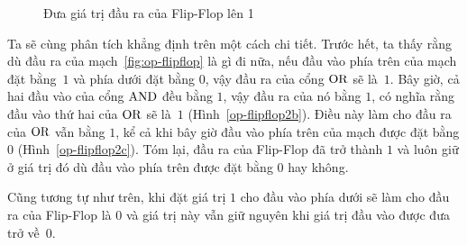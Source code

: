 \begin{figure}[tbh]
{\label{op-flipflop2b}
} \qquad {}
\caption{Đưa giá trị đầu ra của Flip-Flop lên 1}
\label{fig:op-flipflop2}
\end{figure}

Ta sẽ cùng phân tích khẳng định trên một cách chi tiết. Trước hết, ta thấy rằng dù đầu ra
của mạch~\ref{fig:op-flipflop} là gì đi nữa, nếu đầu vào phía trên của mạch đặt
bằng~$1$ và phía dưới đặt bằng $0$, vậy đầu ra của cổng $\operatorname{\mbox{OR}}$ sẽ là~$1$. Bây giờ, cả hai
đầu vào của cổng $\operatorname{\mbox{AND}}$ đều bằng $1$, vậy đầu ra của nó bằng $1$, có nghĩa rằng đầu vào
thứ hai của $\operatorname{\mbox{OR}}$ sẽ là~$1$ (Hình~\ref{op-flipflop2b}). Điều này làm cho đầu ra của $\operatorname{\mbox{OR}}$
vẫn bằng $1$, kể cả khi bây giờ đầu vào phía trên của mạch được đặt bằng $0$ (Hình~\ref{op-flipflop2c}).  Tóm lại, đầu ra của Flip-Flop đã trở thành $1$ và luôn giữ ở giá
trị đó dù đầu vào phía trên được đặt bằng $0$ hay không.
 

Cũng tương tự như trên, khi đặt giá trị $1$ cho đầu vào phía dưới sẽ làm cho đầu ra của
Flip-Flop là $0$ và giá trị này vẫn giữ nguyên khi giá trị đầu vào được đưa trở về~$0$.
   
